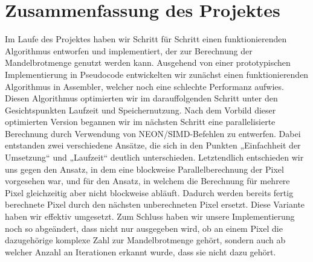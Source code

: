 \documentclass[11pt]{scrartcl}
\begin{document}
\section{Zusammenfassung des Projektes}
Im Laufe des Projektes haben wir Schritt für Schritt einen funktionierenden Algorithmus entworfen und implementiert, der zur Berechnung der Mandelbrotmenge  genutzt werden kann.
Ausgehend von einer prototypischen Implementierung in Pseudocode entwickelten wir zunächst einen funktionierenden Algorithmus in Assembler, welcher noch eine schlechte Performanz aufwies.
Diesen Algorithmus optimierten wir im darauffolgenden Schritt unter den Gesichtspunkten Laufzeit und Speichernutzung.
Nach dem Vorbild dieser optimierten Version begannen wir im nächsten Schritt eine parallelisierte Berechnung durch Verwendung von NEON/SIMD-Befehlen zu entwerfen.
Dabei entstanden zwei verschiedene Ansätze, die sich in den Punkten „Einfachheit der Umsetzung“ und „Laufzeit“ deutlich unterschieden.
Letztendlich entschieden wir uns gegen den Ansatz, in dem eine blockweise Parallelberechnung der Pixel vorgesehen war, und für den Ansatz, in welchem die Berechnung für mehrere Pixel gleichzeitig aber nicht blockweise abläuft.
Dadurch werden bereits fertig berechnete Pixel durch den nächsten unberechneten Pixel ersetzt.
Diese Variante haben wir effektiv umgesetzt.
Zum Schluss haben wir unsere Implementierung noch so abgeändert, dass nicht nur ausgegeben wird, ob an einem Pixel die dazugehörige komplexe Zahl zur Mandelbrotmenge gehört, sondern auch ab welcher Anzahl an Iterationen erkannt wurde, dass sie nicht dazu gehört.
\pagebreak
\end{document}
